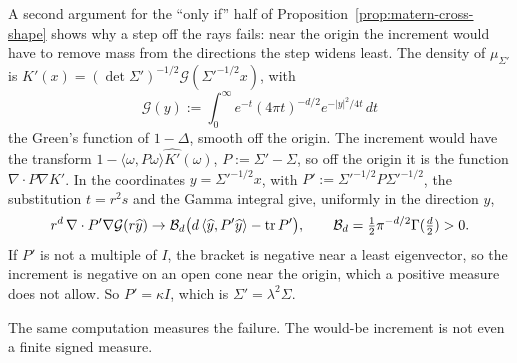 \begin{remark}\label{rem:matern-mechanism}
A second argument for the ``only if'' half of Proposition~\ref{prop:matern-cross-shape} shows why a
step off the rays fails: near the origin the increment would have to remove mass from the directions
the step widens least. The density of $\mu_{\Sigma'}$ is $K'(x) = (\det\Sigma')^{-1/2}\mathcal G(\Sigma'^{-1/2}x)$, with
\[
  \mathcal G(y) := \int_0^\infty e^{-t}(4\pi t)^{-d/2}e^{-|y|^2/4t}\,dt
\]
the Green's function of $1 - \Delta$, smooth off the origin. The increment would have the transform
$1 - \langle\omega,P\omega\rangle\widehat{K'}(\omega)$, $P := \Sigma' - \Sigma$, so off the origin it is
the function $\nabla\cdot P\nabla K'$. In the coordinates $y = \Sigma'^{-1/2}x$, with
$P' := \Sigma'^{-1/2}P\Sigma'^{-1/2}$, the substitution $t = r^2s$ and the Gamma integral give,
uniformly in the direction $\widehat y$,
\[
  r^d\,\nabla\cdot P'\nabla \mathcal G(r\widehat y) \to \mathcal{B}_d\bigl(d\,\langle\widehat y,P'\widehat y\rangle - \operatorname{tr} P'\bigr) ,
  \qquad \mathcal{B}_d = \tfrac12\pi^{-d/2}\Gamma(\tfrac d2) > 0 .
\]
If $P'$ is not a multiple of $I$, the bracket is negative near a least eigenvector, so the increment
is negative on an open cone near the origin, which a positive measure does not allow. So
$P' = \kappa I$, which is $\Sigma' = \lambda^2\Sigma$.
\end{remark}

The same computation measures the failure. The would-be increment is not even a finite signed
measure.

